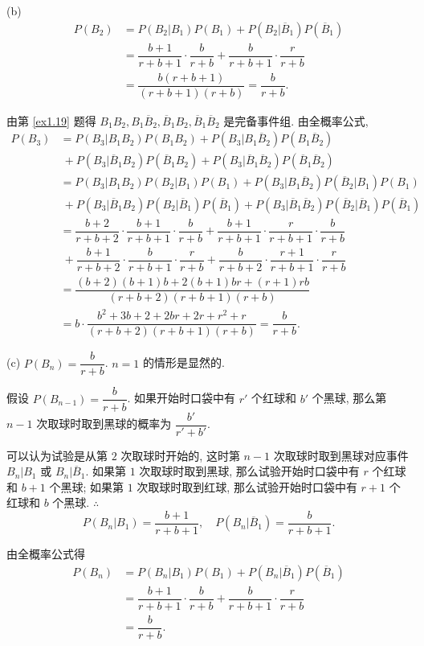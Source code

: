 \documentclass{ctexart}
\begin{document}
\begin{solution}
    (b)
    \begin{align*}
        P(B_2) & =P(B_2|B_1)P(B_1)+P(B_2|\overline{B}_1)P(\overline{B}_1) \\
        & =\dfrac{b+1}{r+b+1}\cdot\dfrac{b}{r+b}+\dfrac{b}{r+b+1}\cdot\dfrac{r}{r+b} \\
        & =\dfrac{b(r+b+1)}{(r+b+1)(r+b)}=\dfrac{b}{r+b}.
    \end{align*}

    由第 \ref{ex1.19} 题得 $B_1B_2,B_1\overline{B}_2,\overline{B}_1B_2,\overline{B}_1\overline{B}_2$ 是完备事件组. 由全概率公式,
    \begin{align*}
        P(B_3) & =P(B_3|B_1B_2)P(B_1B_2)+P(B_3|B_1\overline{B}_2)P(B_1\overline{B}_2) \\
        &\ +P(B_3|\overline{B}_1B_2)P(\overline{B}_1B_2)+P(B_3|\overline{B}_1\overline{B}_2)P(\overline{B}_1\overline{B}_2) \\
        & =P(B_3|B_1B_2)P(B_2|B_1)P(B_1)+P(B_3|B_1\overline{B}_2)P(\overline{B}_2|B_1)P(B_1) \\
        &\ +P(B_3|\overline{B}_1B_2)P(B_2|\overline{B}_1)P(\overline{B}_1)+P(B_3|\overline{B}_1\overline{B}_2)P(\overline{B}_2|\overline{B}_1)P(\overline{B}_1) \\
        & =\dfrac{b+2}{r+b+2}\cdot\dfrac{b+1}{r+b+1}\cdot\dfrac{b}{r+b}+\dfrac{b+1}{r+b+1}\cdot\dfrac{r}{r+b+1}\cdot\dfrac{b}{r+b} \\
        &\ +\dfrac{b+1}{r+b+2}\cdot\dfrac{b}{r+b+1}\cdot\dfrac{r}{r+b}+\dfrac{b}{r+b+2}\cdot\dfrac{r+1}{r+b+1}\cdot\dfrac{r}{r+b} \\
        & =\dfrac{(b+2)(b+1)b+2(b+1)br+(r+1)rb}{(r+b+2)(r+b+1)(r+b)} \\
        & =b\cdot\dfrac{b^2+3b+2+2br+2r+r^2+r}{(r+b+2)(r+b+1)(r+b)}=\dfrac{b}{r+b}.
    \end{align*}

    (c) $P(B_n)=\dfrac{b}{r+b}$. $n=1$ 的情形是显然的.

    假设 $P(B_{n-1})=\dfrac{b}{r+b}$. 如果开始时口袋中有 $r'$ 个红球和 $b'$ 个黑球, 那么第 $n-1$ 次取球时取到黑球的概率为 $\dfrac{b'}{r'+b'}$.

    可以认为试验是从第 $2$ 次取球时开始的, 这时第 $n-1$ 次取球时取到黑球对应事件 $B_n|B_1$ 或 $B_n|\overline{B}_1$. 如果第 $1$ 次取球时取到黑球, 那么试验开始时口袋中有 $r$ 个红球和 $b+1$ 个黑球; 如果第 $1$ 次取球时取到红球, 那么试验开始时口袋中有 $r+1$ 个红球和 $b$ 个黑球. $\therefore$
    \[P(B_n|B_1)=\dfrac{b+1}{r+b+1},\quad P(B_n|\overline{B}_1)=\dfrac{b}{r+b+1}.\]

    由全概率公式得
    \begin{align*}
        P(B_n) & =P(B_n|B_1)P(B_1)+P(B_n|\overline{B}_1)P(\overline{B}_1) \\
        & =\dfrac{b+1}{r+b+1}\cdot\dfrac{b}{r+b}+\dfrac{b}{r+b+1}\cdot\dfrac{r}{r+b} \\
        & =\dfrac{b}{r+b}.
    \end{align*}
\end{solution}
\end{document}
